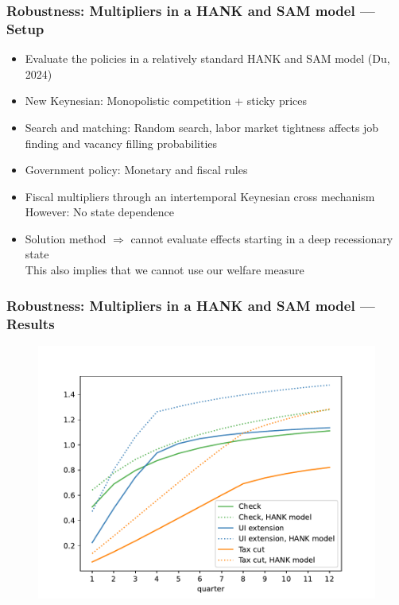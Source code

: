 \documentclass[pdflatex,aspectratio=169]{beamer}
\begin{document}
\begin{frame}
\frametitle{Robustness: Multipliers in a HANK and SAM model --- Setup}
\begin{itemize}
\itemsep = .5\bigskipamount 
\item Evaluate the policies in a relatively standard HANK and SAM model (Du, 2024)
\item New Keynesian: Monopolistic competition + sticky prices
\item Search and matching: Random search, labor market tightness affects job finding and vacancy filling probabilities 
\item Government policy: Monetary and fiscal rules 
\item Fiscal multipliers through an intertemporal Keynesian cross mechanism \\[1ex]
However: No state dependence 
\item Solution method $\Rightarrow$ cannot evaluate effects starting in a deep recessionary state \\[1ex]
This also implies that we cannot use our welfare measure 
\end{itemize}
\end{frame}

\begin{frame}
\frametitle{Robustness: Multipliers in a HANK and SAM model --- Results}
\begin{figure}
\begin{center}
\includegraphics[scale=0.6]{Code/HA-Models/FromPandemicCode/Figures/Cummulative_multipliers_withHank}	
\end{center}
\vspace{0.2cm}
\end{figure}
\end{frame}
\end{document}
